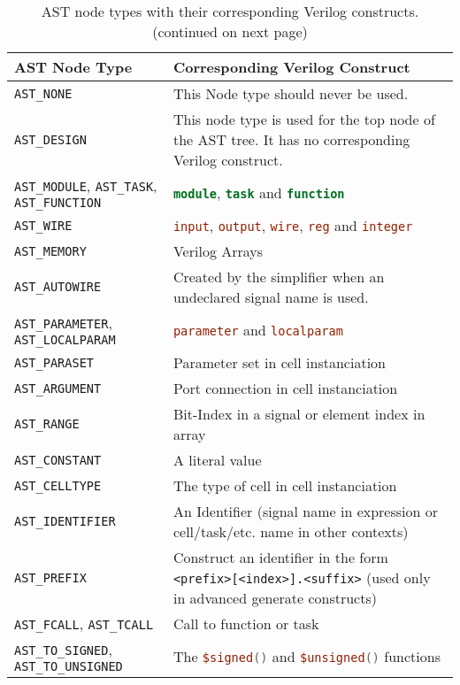 \begin{table}[b!]
\hfil
\begin{tabular}{>{\raggedright\arraybackslash}p{7cm}>{\raggedright\arraybackslash}p{8cm}}
AST Node Type & Corresponding Verilog Construct \\
\hline
\hline
\arrayrulecolor{gray}
{\tt AST\_NONE} & This Node type should never be used. \\
\hline
%
{\tt AST\_DESIGN} & This node type is used for the top node of the AST tree. It
has no corresponding Verilog construct. \\
\hline
%
{\tt AST\_MODULE},
{\tt AST\_TASK},
{\tt AST\_FUNCTION} &
\lstinline[language=Verilog];module;,
\lstinline[language=Verilog];task; and
\lstinline[language=Verilog];function; \\
\hline
%
{\tt AST\_WIRE} &
\lstinline[language=Verilog];input;,
\lstinline[language=Verilog];output;,
\lstinline[language=Verilog];wire;,
\lstinline[language=Verilog];reg; and
\lstinline[language=Verilog];integer; \\
\hline
%
{\tt AST\_MEMORY}  &
Verilog Arrays \\
\hline
%
{\tt AST\_AUTOWIRE} &
Created by the simplifier when an undeclared signal name is used. \\
\hline
%
{\tt AST\_PARAMETER},
{\tt AST\_LOCALPARAM} &
\lstinline[language=Verilog];parameter; and
\lstinline[language=Verilog];localparam; \\
\hline
%
{\tt AST\_PARASET} &
Parameter set in cell instanciation \\
\hline
%
{\tt AST\_ARGUMENT} &
Port connection in cell instanciation \\
\hline
%
{\tt AST\_RANGE} &
Bit-Index in a signal or element index in array \\
\hline
%
{\tt AST\_CONSTANT} &
A literal value \\
\hline
%
{\tt AST\_CELLTYPE} &
The type of cell in cell instanciation \\
\hline
%
{\tt AST\_IDENTIFIER} &
An Identifier (signal name in expression or cell/task/etc. name in other contexts) \\
\hline
%
{\tt AST\_PREFIX} &
Construct an identifier in the form {\tt <prefix>[<index>].<suffix>} (used only in
advanced generate constructs) \\
\hline
%
{\tt AST\_FCALL},
{\tt AST\_TCALL} &
Call to function or task \\
\hline
%
{\tt AST\_TO\_SIGNED},
{\tt AST\_TO\_UNSIGNED} &
The \lstinline[language=Verilog];$signed(); and
\lstinline[language=Verilog];$unsigned(); functions \\
\hline
\end{tabular}
\caption{AST node types with their corresponding Verilog constructs. \\ (continued on next page)}
\label{tab:Verilog_AstNodeType}
\end{table}

